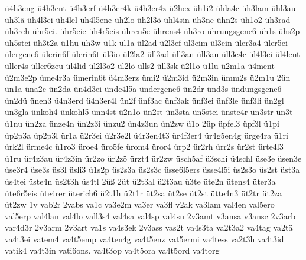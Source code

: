 {    ü4h3eng
    ü4h3ent
    ü4h3erf
    ü4h3er4k
    ü4h3er4z
    ü2hex
    üh1i2
    ühla4c
    üh3lam
    ühl3au
    üh3lä
    üh4l3ei
    üh4lel
    üh4l5ene
    üh2lo
    üh2l3ö
    ühl4sin
    üh3ne
    ühn2s
    üh1o2
    üh3rad
    üh3reh
    ühr5ei.
    ühr5eie
    üh4r5eis
    ühren5e
    ührens4
    üh3ro
    ührungsgene6
    üh1s
    ühs2p
    üh5stei
    üh3t2a
    ü1hu
    üh3w
    ü1k
    ül1a
    ül2ad
    ü2l3ef
    ül3eim
    ül3ein
    üler3a4
    üler5ei
    ülergene6
    ülerin6f
    ülerin6t
    ül3io
    ül2la2
    üll3ad
    üll3an
    üll3au
    üll3e4c
    ül4l3ei
    ül4lent
    üller4s
    üller6zeu
    ül4lid
    ül2l3o2
    ül2lö
    ülls2
    üll3sk
    ü2l1o
    ü1lu
    ü2m1a
    ü4ment
    ü2m3e2p
    üme4r3a
    ümerin6t
    ü4m3erz
    ümi2
    ü2m3id
    ü2m3in
    ümm2s
    ü2m1u
    2ün
    ün1a
    üna2c
    ün2da
    ün4d3ei
    ünde4l5a
    ündergene6
    ün2dr
    ünd3s
    ündungsgene6
    ün2dü
    ünen3
    ü4n3erd
    ü4n3er4l
    ün2f
    ünf3ac
    ünf3ak
    ünf3ei
    ünf3le
    ünf3li
    ün2gl
    ün3gla
    ünkoh4
    ünkohl5
    ünn4st
    ü2n1o
    ün2st
    ün3sta
    ün5stei
    ünste4r
    ün3str
    ün3t
    ü1nu
    ün2za
    ünze4n
    ün2z3i
    ünzu2
    ün4z3un
    ün2zw
    ü1o
    2üp
    üpfel3
    üpf3l
    ü1pi
    üp2p3a
    üp2p3l
    ür1a
    ü2r3ei
    ü2r3e2l
    ü4r3en4t3
    ür4f3er4
    ür4g5en4g
    ürge4ra
    ü1ri
    ürk2l
    ürme4c
    ü1ro3
    üroe4
    üro5fe
    ürom4
    üror4
    ürp2
    ür2rh
    ürr2s
    ür2st
    ürte4l3
    ü1ru
    ür4z3au
    ür4z3in
    ür2zo
    ür2zö
    ürzt4
    ür2zw
    üsch5af
    ü3schi
    ü4schl
    üse3e
    üsen3e
    üse3r4
    üse3s
    üs3l
    üsli3
    ü1s2p
    üs2s3a
    üs2s3c
    üsse6l5ers
    üsse4l5i
    üs2s3o
    üs2st
    üst3a
    üs4tei
    üste4n
    üs2t3h
    üs4tl
    2üß
    2üt
    ü2t3al
    ü2t3au
    ü3te
    üte2n
    ütens4
    üter3a
    üte6r5eis
    üte4rer
    üterich6
    ü2t1h
    ü2t1r
    üt2sa
    üt2se
    üt2st
    ütte4n3
    üt2tr
    üt2za
    üt2zw
    1v
    vab2r
    2vabs
    va1c
    va3e2m
    va3er
    va3fl
    v2ak
    va3lam
    val4en
    val5ero
    val5erp
    val4lan
    val4lo
    vall3s4
    val4sa
    val4sp
    val4su
    2v3amt
    v3ansa
    v3ansc
    2v3arb
    var4d3r
    2v3arm
    2v3art
    va1s
    va4s3ek
    2v3ass
    vas2t
    va4s3ta
    va2t3a2
    va4tag
    va2tä
    va4t3ei
    vatem4
    va4t5emp
    va4ten4g
    va4t5enz
    vat5ermi
    va4tess
    va2t3h
    va4t3id
    vatik4
    va4t3in
    vati6ons.
    va4t3op
    va4t5ora
    va4t5ord
    va4torg
}
